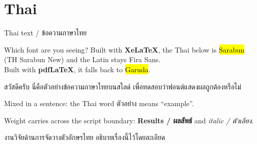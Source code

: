 \section{Thai}


\begin{frame}{Thai text / ข้อความภาษาไทย}
  \begin{block}{Which font are you seeing?}
    Built with \textbf{XeLaTeX}, the Thai below is \hl{Sarabun} (TH Sarabun
    New) and the Latin stays Fira Sans.\\
    Built with \textbf{pdfLaTeX}, it falls back to \hl{Garuda}.
  \end{block}

  สวัสดีครับ นี่คือตัวอย่างข้อความภาษาไทยบนสไลด์ เพื่อทดสอบว่าฟอนต์แสดงผลถูกต้องหรือไม่

  Mixed in a sentence: the Thai word ตัวอย่าง means ``example''.

  Weight carries across the script boundary: \textbf{Results / ผลลัพธ์}
  and \textit{italic / ตัวเอียง}.

  งานวิจัยด้านการจัดวางตัวอักษรไทย \cite{tantisiriwat2020} อธิบายเรื่องนี้ไว้โดยละเอียด
\end{frame}

